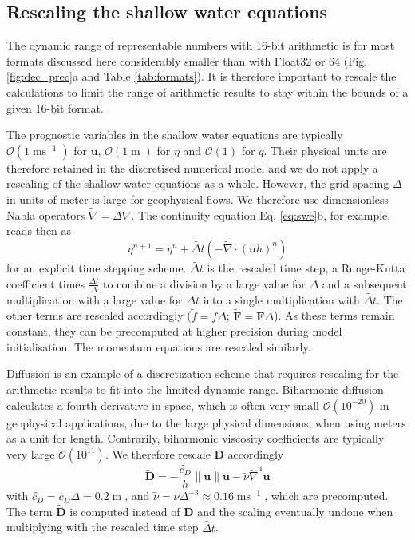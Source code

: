 \documentclass[draft]{agujournal2019}
\newcommand{\op}{\operatorname}
\begin{document}
\subsection{Rescaling the shallow water equations}
\label{sec:swm_rescale}

The dynamic range of representable numbers with 16-bit arithmetic is for most
formats discussed here considerably smaller than with Float32 or 64
(Fig. \ref{fig:dec_prec}a and Table \ref{tab:formats}). It is therefore
important to rescale the calculations to limit the range of
arithmetic results to stay within the bounds of a given 16-bit format.

The prognostic variables in the shallow water equations are typically
$\mathcal{O}(1\op{ms}^{-1})$ for $\mathbf{u}$, $\mathcal{O}(1\op{m})$ for
$\eta$ and $\mathcal{O}(1)$ for $q$. Their physical units are therefore retained
in the discretised numerical model and we do not apply a rescaling of the shallow
water equations as a whole. However, the grid spacing $\Delta$ in units of meter
is large for geophysical flows. We therefore use dimensionless Nabla operators
$\tilde{\nabla} = \Delta\nabla$. The continuity equation Eq. \ref{eq:swe}b,
for example, reads then as
\begin{equation}
\eta^{n+1} = \eta^n + \tilde{\Delta t}\left( - \tilde{\nabla} \cdot (\mathbf{u}h)^n\right)
\label{eq:discr}
\end{equation}
for an explicit time stepping scheme. $\tilde{\Delta t}$ is the rescaled time
step, a Runge-Kutta coefficient times $\tfrac{\Delta t}{\Delta}$ to combine a
division by a large value for $\Delta$ and a subsequent multiplication with a
large value for $\Delta t$ into a single multiplication with $\tilde{\Delta t}$.
The other terms are rescaled accordingly ($\tilde{f} = f\Delta$;
$\tilde{\mathbf{F}} = \mathbf{F}\Delta$). As these terms remain constant, they
can be precomputed at higher precision during model initialisation.
The momentum equations are rescaled similarly.

Diffusion is an example of a discretization scheme that requires rescaling for
the arithmetic results to fit into the limited dynamic range. Biharmonic diffusion
\cite{Griffies2000} calculates a fourth-derivative in space,
which is often very small $\mathcal{O}(10^{-20})$ in geophysical applications,
due to the large physical dimensions, when using meters as a unit for length.
Contrarily, biharmonic viscosity coefficients are typically very large
$\mathcal{O}(10^{11})$.
We therefore rescale $\mathbf{D}$ accordingly
\begin{equation}
\tilde{\mathbf{D}} =-\frac{\tilde{c_D}}{h}\| \mathbf{u} \| \mathbf{u} -
\tilde{\nu}\tilde{\nabla}^4\mathbf{u}
\end{equation}
with $\tilde{c_D} = c_D\Delta = 0.2\op{m}$,  and $\tilde{\nu} = \nu\Delta^{-3}
\approx 0.16\op{ms}^{-1}$, which are precomputed. The term
$\tilde{\mathbf{D}}$ is computed instead of $\mathbf{D}$ and the scaling eventually
undone when multiplying with the rescaled time step $\tilde{\Delta t}$.
\end{document}
